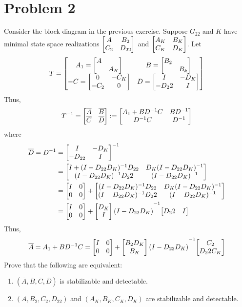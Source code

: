 \documentclass[letter]{article}
\numberwithin{equation}{section}
\begin{document}
\section{Problem 2}
Consider the block diagram in the previous exercise. 
Suppose $G_{22}$ and $K$ have minimal state space realizations $\mqty[
    A   &B_2\\
    C_2 &D_{22}
]$ and $\mqty[
    A_K &B_K\\
    C_K &D_K
]$. Let \[
    T = \mqty[
        A_1 = \mqty[\dmat{A, A_K}]      &B = \mqty[\dmat{B_2, B_k}]\\
        -C = \mqty[0 &-C_K\\ -C_2 & 0]  &D = \mqty[I &-D_K\\ -D_22 &I]
    ]
\] Thus,\[
    T^{-1} = \mqty[
        \overline{A} &\overline{B}\\
        \overline{C} &\overline{D}
    ] := \mqty[
        A_1 + B D^{-1} C    &BD^{-1}\\
        D^{-1} C            &D^{-1}
    ]
\] where \begin{align*}
    \overline{D} = D^{-1} 
    &= \mqty[
            I   &-D_K\\
            -D_{22} &I
        ]^{-1}\\
    &= \mqty[
            I + (I - D_{22} D_K)^{-1} D_{22}    &D_K(I - D_{22} D_K)^{-1}\\
            (I - D_{22}D_K)^{-1}D_22            &(I-D_{22} D_K)^{-1}
        ]\\
    &= \mqty[I &0\\ 0 &0] + \mqty[
            (I - D_{22} D_K)^{-1} D_{22}    &D_K(I - D_{22} D_K)^{-1}\\
            (I - D_{22}D_K)^{-1}D_22            &(I-D_{22} D_K)^{-1}
        ]\\
    &= \mqty[I &0\\ 0 &0] + \mqty[D_K\\I] (I - D_{22} D_K)^{-1} \mqty[D_22 & I]
\end{align*}
Thus,\[
    \overline{A} = A_1 + B D^{-1} C
        = \mqty[
            I &0\\
            0 &0
        ] + \mqty[
            B_2 D_K\\
            B_K
        ] (I - D_{22} D_K)^{-1} \mqty[
            C_2\\
            D_22 C_K
        ]
\]
Prove that the following are equivalent:
\begin{enumerate}
    \item $(\overline{A}, \overline{B}, \overline{C}, \overline{D})$ is stabilizable and detectable.
    \item $(A, B_2, C_2, D_{22})$ and $(A_K, B_K, C_K, D_K)$ are stabilizable and detectable.
\end{enumerate}
\end{document}
